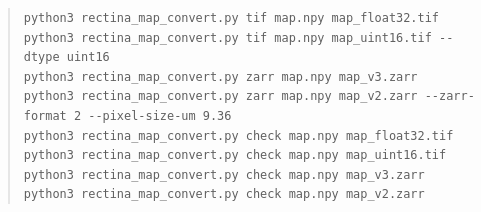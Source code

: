 \begin{quote}
\begin{Verbatim}[fontsize=\scriptsize,breaklines=true,breakanywhere=true,breakautoindent=false]
python3 rectina_map_convert.py tif map.npy map_float32.tif
python3 rectina_map_convert.py tif map.npy map_uint16.tif --dtype uint16
python3 rectina_map_convert.py zarr map.npy map_v3.zarr
python3 rectina_map_convert.py zarr map.npy map_v2.zarr --zarr-format 2 --pixel-size-um 9.36
python3 rectina_map_convert.py check map.npy map_float32.tif
python3 rectina_map_convert.py check map.npy map_uint16.tif
python3 rectina_map_convert.py check map.npy map_v3.zarr
python3 rectina_map_convert.py check map.npy map_v2.zarr
\end{Verbatim}
\end{quote}
